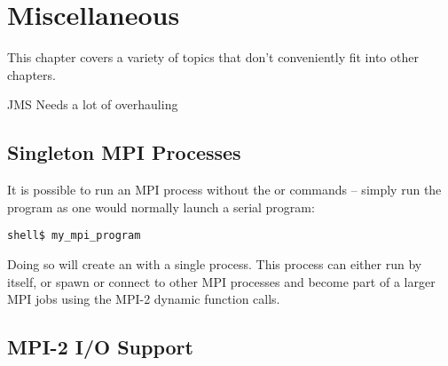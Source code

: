 %
% 
% 
%

\chapter{Miscellaneous}
\label{sec:misc}

This chapter covers a variety of topics that don't conveniently fit
into other chapters.

{\Huge JMS Needs a lot of overhauling}


\section{Singleton MPI Processes}

It is possible to run an MPI process without the  or
 commands -- simply run the program as one would normally
launch a serial program:

\lstset{style=lam-cmdline}
\begin{lstlisting}
shell$ my_mpi_program
\end{lstlisting}

Doing so will create an \mcw with a single process.  This process can
either run by itself, or spawn or connect to other MPI processes and
become part of a larger MPI jobs using the MPI-2 dynamic function
calls.  


\section{MPI-2 I/O Support}

